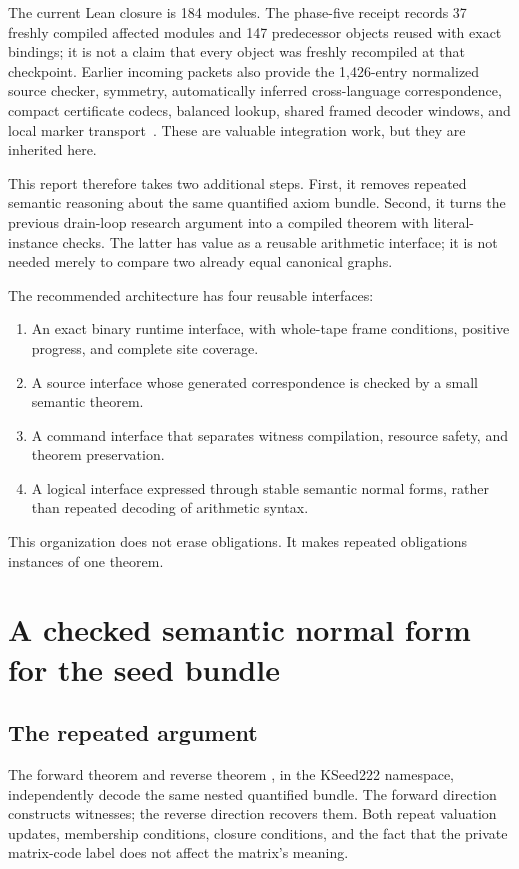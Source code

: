 \documentclass[11pt]{article}
\newcommand{\code}[1]{\texttt{\detokenize{#1}}}
\begin{document}
The current Lean closure is 184 modules. The phase-five receipt records 37 freshly compiled affected modules and 147 predecessor objects reused with exact bindings; it is not a claim that every object was freshly recompiled at that checkpoint. Earlier incoming packets also provide the 1,426-entry normalized source checker, symmetry, automatically inferred cross-language correspondence, compact certificate codecs, balanced lookup, shared framed decoder windows, and local marker transport~\cite{proposals,automatic}. These are valuable integration work, but they are inherited here.

This report therefore takes two additional steps. First, it removes repeated semantic reasoning about the same quantified axiom bundle. Second, it turns the previous drain-loop research argument into a compiled theorem with literal-instance checks. The latter has value as a reusable arithmetic interface; it is not needed merely to compare two already equal canonical graphs.

The recommended architecture has four reusable interfaces:
\begin{enumerate}
\item An exact binary runtime interface, with whole-tape frame conditions, positive progress, and complete site coverage.
\item A source interface whose generated correspondence is checked by a small semantic theorem.
\item A command interface that separates witness compilation, resource safety, and theorem preservation.
\item A logical interface expressed through stable semantic normal forms, rather than repeated decoding of arithmetic syntax.
\end{enumerate}
This organization does not erase obligations. It makes repeated obligations instances of one theorem.

\section{A checked semantic normal form for the seed bundle}

\subsection{The repeated argument}

The forward theorem \code{bundle_of_seed} and reverse theorem \code{seed_of_bundle}, in the KSeed222 namespace, independently decode the same nested quantified bundle. The forward direction constructs witnesses; the reverse direction recovers them. Both repeat valuation updates, membership conditions, closure conditions, and the fact that the private matrix-code label does not affect the matrix's meaning.
\end{document}
